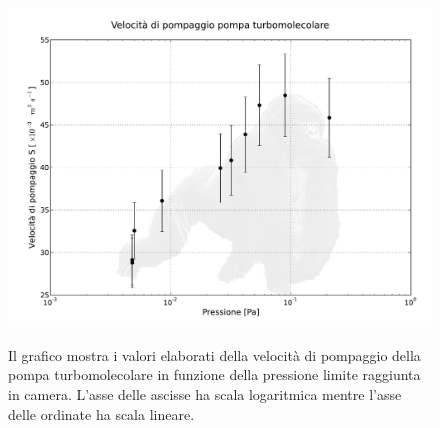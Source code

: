 

\begin{figure}[b]
	\centering
		\includegraphics[width=14cm]{turbo.pdf}
		\label{fig:turbo}
	\caption{Il grafico mostra i valori elaborati della velocità di pompaggio della pompa turbomolecolare in funzione della pressione limite raggiunta in camera. L'asse delle ascisse ha scala logaritmica mentre l'asse delle ordinate ha scala lineare.}
\end{figure}